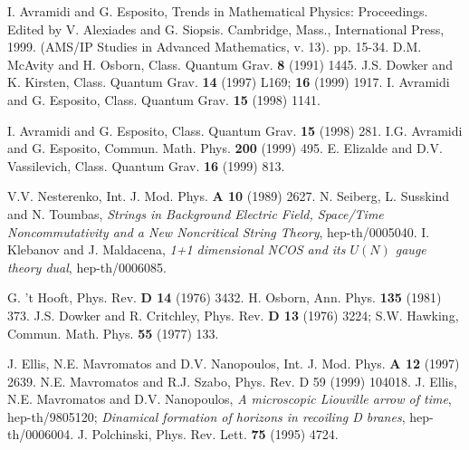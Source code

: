 \documentclass[a4paper,12pt]{article}
\begin{document}
\begin{thebibliography}{99}
I. Avramidi and G. Esposito,
Trends in Mathematical Physics: Proceedings. 
Edited by V. Alexiades and G. Siopsis.
Cambridge, Mass., International Press, 1999. 
(AMS/IP Studies in Advanced Mathematics,
v. 13). pp. 15-34. 
 D.M. McAvity and H. Osborn, Class. Quantum Grav. 
\textbf{8} (1991) 1445. 
 J.S. Dowker and K. Kirsten, Class. Quantum Grav. 
\textbf{14} (1997) L169; \textbf{16}
(1999) 1917.
 I. Avramidi and G. Esposito, Class. Quantum Grav. 
\textbf{15} (1998) 1141. 
 
 I. Avramidi and G. Esposito, Class. Quantum Grav. 
\textbf{15} (1998) 281.  
 I.G. Avramidi and G. Esposito, 
Commun. Math. Phys. \textbf{200} (1999) 495.
 E. Elizalde and D.V. Vassilevich, 
Class. Quantum Grav. \textbf{16} (1999) 813.

V.V. Nesterenko, Int. J. Mod. Phys. \textbf{A 10} (1989) 2627.
N. Seiberg, L. Susskind and N. Toumbas,
{\it Strings in Background Electric Field, Space/Time
Noncommutativity and a New Noncritical String Theory},
hep-th/0005040.
I. Klebanov and J. Maldacena, {\it 1+1 dimensional NCOS and
its $U(N)$ gauge theory dual}, hep-th/0006085.

G. 't Hooft, Phys. Rev. {\bf D 14} (1976) 3432.
H. Osborn, Ann. Phys. {\bf 135} (1981) 373.
J.S. Dowker and R. Critchley, Phys. Rev. 
\textbf{D 13} (1976) 3224; S.W. Hawking,
Commun. Math. Phys. \textbf{55} (1977) 133. 


J. Ellis, N.E. Mavromatos and D.V. Nanopoulos,
Int. J. Mod. Phys. {\bf A 12} (1997) 2639.
N.E. Mavromatos and R.J. Szabo, Phys. Rev. {D 59} (1999) 104018.
J. Ellis, N.E. Mavromatos and D.V. Nanopoulos, {\it
A microscopic Liouville arrow of time}, hep-th/9805120;
{\it Dinamical formation of horizons in recoiling
D branes}, hep-th/0006004.
J. Polchinski, Phys. Rev. Lett. {\bf 75} (1995) 4724.


\end{thebibliography}
\end{document}
